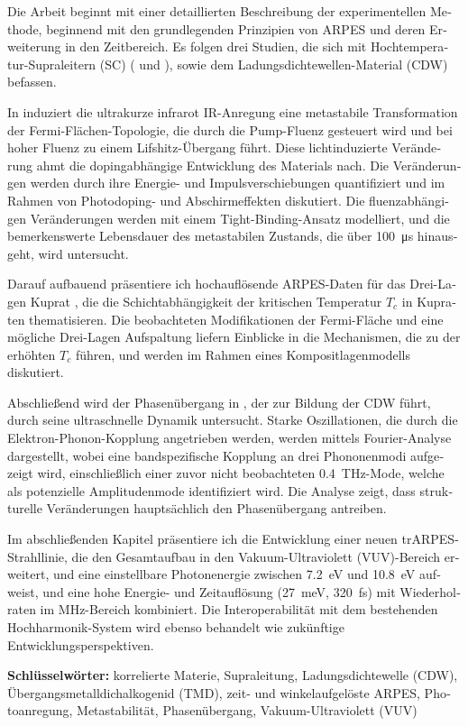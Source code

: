 \begin{otherlanguage}{german}
Die Arbeit beginnt mit einer detaillierten Beschreibung der experimentellen Methode, beginnend mit den grundlegenden Prinzipien von ARPES und deren Erweiterung in den Zeitbereich.
Es folgen drei Studien, die sich mit Hochtemperatur-Supraleitern (SC) ( und ), sowie dem Ladungsdichtewellen-Material (CDW)  befassen.

In  induziert die ultrakurze infrarot IR-Anregung eine metastabile Transformation der Fermi-Flächen-Topologie, die durch die Pump-Fluenz gesteuert wird und bei hoher Fluenz zu einem Lifshitz-Übergang führt.
Diese lichtinduzierte Veränderung ahmt die dopingabhängige Entwicklung des Materials nach.
Die Veränderungen werden durch ihre Energie- und Impulsverschiebungen quantifiziert und im Rahmen von Photodoping- und Abschirmeffekten diskutiert.
Die fluenzabhängigen Veränderungen werden mit einem Tight-Binding-Ansatz modelliert, und die bemerkenswerte Lebensdauer des metastabilen Zustands, die über \qty{100}{\micro\second} hinausgeht, wird untersucht.

Darauf aufbauend präsentiere ich hochauflösende ARPES-Daten für das Drei-Lagen Kuprat , die die Schichtabhängigkeit der kritischen Temperatur $T_c$ in Kupraten thematisieren.
Die beobachteten Modifikationen der Fermi-Fläche und eine mögliche Drei-Lagen Aufspaltung liefern Einblicke in die Mechanismen, die zu der erhöhten $T_c$ führen, und werden im Rahmen eines Kompositlagenmodells diskutiert.

Abschließend wird der Phasenübergang in , der zur Bildung der CDW führt, durch seine ultraschnelle Dynamik untersucht.
Starke Oszillationen, die durch die Elektron-Phonon-Kopplung angetrieben werden, werden mittels Fourier-Analyse dargestellt, wobei eine bandspezifische Kopplung an drei Phononenmodi aufgezeigt wird, einschließlich einer zuvor nicht beobachteten \qty{0.4}{\tera\hertz}-Mode, welche als potenzielle Amplitudenmode identifiziert wird.
Die Analyse zeigt, dass strukturelle Veränderungen hauptsächlich den Phasenübergang antreiben.

Im abschließenden Kapitel präsentiere ich die Entwicklung einer neuen trARPES-Strahllinie, die den Gesamtaufbau in den Vakuum-Ultraviolett (VUV)-Bereich erweitert, und eine einstellbare Photonenergie zwischen \qty{7.2}{\electronvolt} und \qty{10.8}{\electronvolt} aufweist, und eine hohe Energie- und Zeitauflösung (\qty{27}{\milli\electronvolt}, \qty{320}{\femto\second}) mit Wiederholraten im \unit{\mega\hertz}-Bereich kombiniert.
Die Interoperabilität mit dem bestehenden Hochharmonik-System wird ebenso behandelt wie zukünftige Entwicklungsperspektiven.\hfill\break

\textbf{Schlüsselwörter:} korrelierte Materie, Supraleitung, Ladungsdichtewelle (CDW), Übergangsmetalldichalkogenid (TMD), zeit- und winkelaufgelöste ARPES, Photoanregung, Metastabilität, Phasenübergang, Vakuum-Ultraviolett (VUV)

\end{otherlanguage}




